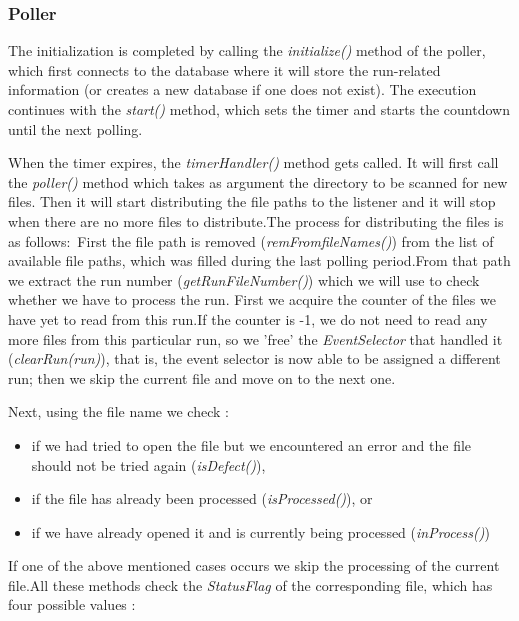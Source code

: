\subsubsection{\textbf{Poller}}
The initialization is completed by calling the \textit{initialize()} method of the poller, which first connects to the database where it will store the run-related information (or creates a new database if one does not exist). The execution continues with the \textit{start()} method, which sets the timer and starts the countdown until the next polling.\par
When the timer expires, the \textit{timerHandler()} method gets called. It will first call the \textit{poller()} method which takes as argument the directory to be scanned for new files. Then it will start distributing the file paths to the listener and it will stop when there are no more files to distribute.The process for distributing the files is as follows:~First the file path is removed (\textit{remFromfileNames()}) from the list of available file paths, which was filled during the last polling period.From that path we extract the run number (\textit{getRunFileNumber()}) which we will use to check whether we have to process the run. First we acquire the counter of the files we have yet to read from this run.If the counter is -1, we do not need to read any more files from this particular run, so we 'free' the \textit{EventSelector} that handled it (\textit{clearRun(run)}), that is, the event selector is now able to be assigned a different run; then we skip the current file and move on to the next one.\par
Next, using the file name we check :\par
\begin{itemize}
\item if we had tried to open the file but we encountered an error and the file should not be tried again (\textit{isDefect()}),\par
\item if the file has already been processed (\textit{isProcessed()}), or\par
\item if we have already opened it and is currently being processed (\textit{inProcess()})\par
\end{itemize}
If one of the above mentioned cases occurs we skip the processing of the current file.All these methods check the \textit{StatusFlag} of the corresponding file, which has four possible values :\par
